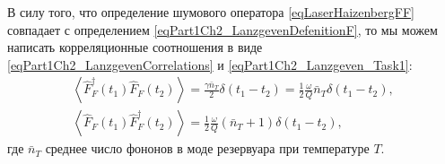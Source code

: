 В силу того, что определение шумового оператора
\eqref{eqLaserHaizenbergFF} совпадает с
определением \eqref{eqPart1Ch2_LanzgevenDefenitionF}, то мы можем
написать корреляционные соотношения в виде
\eqref{eqPart1Ch2_LanzgevenCorrelations} и \eqref{eqPart1Ch2_Lanzgeven_Task1}:
\begin{eqnarray}
\left<\hat{F}_{F}^{\dag}\left(t_1\right)\hat{F}_{F}\left(t_2\right)\right> = 
\frac{\gamma \bar{n}_T}{2} \delta\left(t_1 - t_2\right) = 
\frac{1}{2}\frac{\omega}{Q}\bar{n}_T\delta\left(t_1 - t_2\right),
\nonumber \\
\left<\hat{F}_{F}\left(t_1\right)\hat{F}_{F}^{\dag}\left(t_2\right)\right> = 
\frac{1}{2}\frac{\omega}{Q}\left(\bar{n}_T + 1 \right)\delta\left(t_1 - t_2\right),
\label{eqLaserHaizenbergFFCorrel}
\end{eqnarray}
где $\bar{n}_T$ среднее число фононов в моде резервуара при
температуре $T$.
